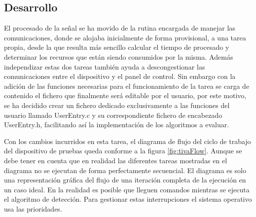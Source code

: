     \subsection{Desarrollo}
        
        El procesado de la señal se ha movido de la rutina encargada de manejar las comunicaciones, donde se alojaba inicialmente de forma provisional, a una tarea propia, desde la que resulta más sencillo calcular el tiempo de procesado y determinar los recursos que están siendo consumidos por la misma. Además independizar estas dos tareas también ayuda a descongestionar las comunicaciones entre el dispositivo y el panel de control. Sin embargo con la adición de las funciones necesarias para el funcionamiento de la tarea se carga de contenido el fichero que finalmente será editable por el usuario, por este motivo, se ha decidido crear un fichero dedicado exclusivamente a las funciones del usuario llamado UserEntry.c y su correspondiente fichero de encabezado UserEntry.h, facilitando así la implementación de los algoritmos a evaluar. 
        
        Con los cambios incurridos en esta tarea, el diagrama de flujo del ciclo de trabajo del dispositivo de pruebas queda conforme a la figura \ref{fig:tivaFlow}. Aunque se debe tener en cuenta que en realidad las diferentes tareas mostradas en el diagrama no se ejecutan de forma perfectamente secuencial. El diagrama es solo una representación gráfica del flujo de una iteración completa de la ejecución en un caso ideal. En la realidad es posible que lleguen comandos mientras se ejecuta el algoritmo de detección. Para gestionar estas interrupciones el sistema operativo usa las prioridades.
        
